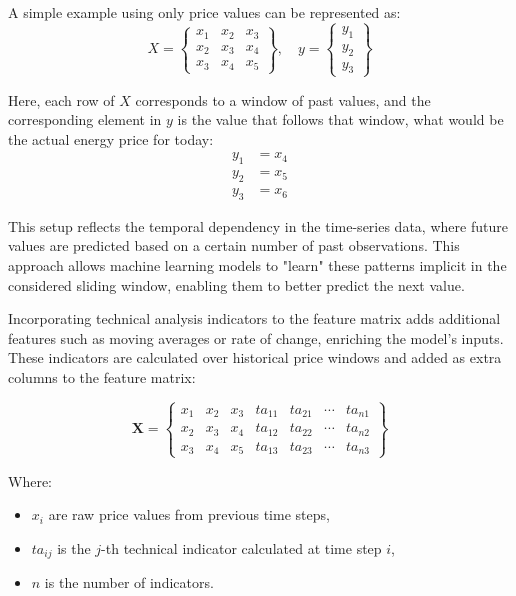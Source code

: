\documentclass[12pt]{report} %
\begin{document}
A simple example using only price values can be represented as:
\begin{equation*}
{X} = \begin{Bmatrix}
x_1 & x_2 & x_3 \\
x_2 & x_3 & x_4 \\
x_3 & x_4 & x_5
\end{Bmatrix}, \quad
{y} = \begin{Bmatrix}
y_1 \\
y_2 \\
y_3
\end{Bmatrix}
\end{equation*}

Here, each row of $\mathit{X}$ corresponds to a window of past values, and the corresponding element in $\mathit{y}$ is the value that follows that window, what would be the actual energy price for today:
\begin{align*}
y_1 &= x_4 \\
y_2 &= x_5 \\
y_3 &= x_6
\end{align*}

This setup reflects the temporal dependency in the time-series data, where future values are predicted based on a certain number of past observations. This approach allows machine learning models to "learn" these patterns implicit in the considered sliding window, enabling them to better predict the next value.

Incorporating technical analysis indicators to the feature matrix adds additional features such as moving averages or rate of change, enriching the model’s inputs. These indicators are calculated over historical price windows and added as extra columns to the feature matrix:

\begin{equation*}
\mathbf{X} = \begin{Bmatrix}
x_1 & x_2 & x_3 & ta_{11} & ta_{21} & \cdots & ta_{n1}\\
x_2 & x_3 & x_4 & ta_{12} & ta_{22} & \cdots & ta_{n2}\\
x_3 & x_4 & x_5 & ta_{13} & ta_{23} & \cdots & ta_{n3}
\end{Bmatrix}
\end{equation*}

Where:
\begin{itemize}
    \item $x_i$ are raw price values from previous time steps,
    \item $ta_{ij}$ is the $j$-th technical indicator calculated at time step $i$,
    \item $n$ is the number of indicators.
\end{itemize}
\end{document}
